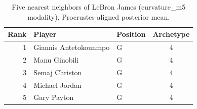 \begin{table}[htbp]
  \centering\small
  \begin{tabular}{rllc}
    \toprule
    Rank & Player & Position & Archetype \\
    \midrule
    1 & Giannis Antetokounmpo & G & 4 \\
    2 & Manu Ginobili & G & 4 \\
    3 & Semaj Christon & G & 4 \\
    4 & Michael Jordan & G & 4 \\
    5 & Gary Payton & G & 4 \\
    \bottomrule
  \end{tabular}
  \caption{Five nearest neighbors of LeBron James (curvature_m5 modality), Procrustes-aligned posterior mean.}
  \label{tab:LeBron_James_neighbors_curvature_m5}
\end{table}

